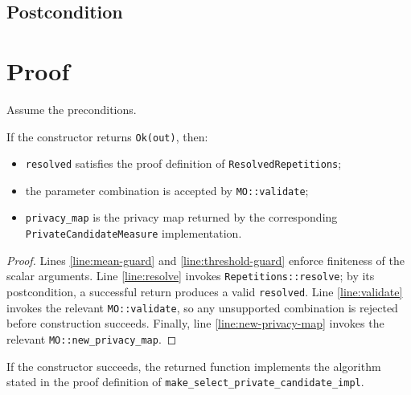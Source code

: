 \documentclass{article}
\begin{document}
\subsection*{Postcondition}
\begin{theorem}
\label{postcondition}
\end{theorem}

\section{Proof}
Assume the preconditions.

\begin{lemma}
\label{construction}
If the constructor returns \texttt{Ok(out)}, then:
\begin{itemize}
    \item \texttt{resolved} satisfies the proof definition of \texttt{ResolvedRepetitions};
    \item the parameter combination is accepted by \texttt{MO::validate};
    \item \texttt{privacy\_map} is the privacy map returned by the corresponding
    \texttt{PrivateCandidateMeasure} implementation.
\end{itemize}
\end{lemma}

\begin{proof}
Lines \ref{line:mean-guard} and \ref{line:threshold-guard} enforce finiteness of the scalar
arguments. Line \ref{line:resolve} invokes
\texttt{Repetitions::resolve}; by its postcondition, a
successful return produces a valid \texttt{resolved}. Line \ref{line:validate} invokes the relevant
\texttt{MO::validate}, so any unsupported combination is rejected before construction succeeds.
Finally, line \ref{line:new-privacy-map} invokes the relevant \texttt{MO::new\_privacy\_map}.
\end{proof}

\begin{lemma}
\label{algorithm}
If the constructor succeeds, the returned function implements the algorithm stated in the proof
definition of \texttt{make\_select\_private\_candidate\_impl}.
\end{lemma}
\end{document}
